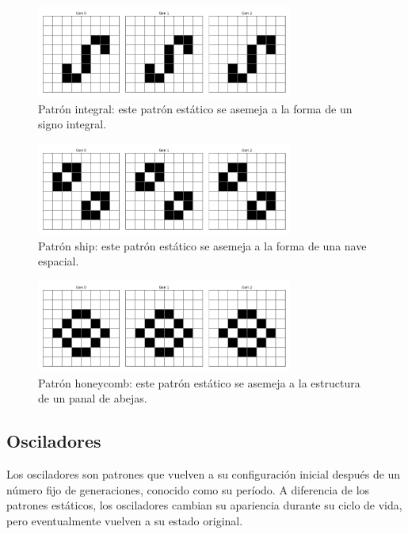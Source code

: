 \documentclass[]{article}
\begin{document}
\begin{figure}[H]
  \centering
  \includegraphics[width=0.75\textwidth]{../assets/still_life/integral/integral.png}
  \caption{Patrón integral: este patrón estático se asemeja a la forma de un signo integral.}
  \label{fig:integral}
\end{figure}

\begin{figure}[H]
  \centering
  \includegraphics[width=0.75\textwidth]{../assets/still_life/ship/ship.png}
  \caption{Patrón ship: este patrón estático se asemeja a la forma de una nave espacial.}
  \label{fig:ship}
\end{figure}

\begin{figure}[H]
  \centering
  \includegraphics[width=0.75\textwidth]{../assets/still_life/honeycomb/honeycomb.png}
  \caption{Patrón honeycomb: este patrón estático se asemeja a la estructura de un panal de abejas.}
  \label{fig:honeycomb}
\end{figure}

\subsection{Osciladores}
Los osciladores son patrones que vuelven a su configuración inicial después de un número fijo de generaciones, conocido como su período. A diferencia de los patrones estáticos, los osciladores cambian su apariencia durante su ciclo de vida, pero eventualmente vuelven a su estado original.
\end{document}

